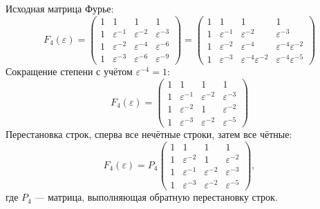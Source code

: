 Исходная матрица Фурье:
\[
    F_4(\varepsilon)
    = \begin{pmatrix}
          1 & 1                & 1                & 1                \\
          1 & \varepsilon^{-1} & \varepsilon^{-2} & \varepsilon^{-3} \\
          1 & \varepsilon^{-2} & \varepsilon^{-4} & \varepsilon^{-6} \\
          1 & \varepsilon^{-3} & \varepsilon^{-6} & \varepsilon^{-9}
    \end{pmatrix}
    = \begin{pmatrix}
          1 & 1                & 1                                 & 1                                 \\
          1 & \varepsilon^{-1} & \varepsilon^{-2}                  & \varepsilon^{-3}                  \\
          1 & \varepsilon^{-2} & \varepsilon^{-4}                  & \varepsilon^{-4} \varepsilon^{-2} \\
          1 & \varepsilon^{-3} & \varepsilon^{-4} \varepsilon^{-2} & \varepsilon^{-4} \varepsilon^{-5}
    \end{pmatrix}
\]
Сокращение степени с учётом $\varepsilon^{-4} = 1$:
\[
    F_4(\varepsilon)
    = \begin{pmatrix}
          1 & 1                & 1                & 1                \\
          1 & \varepsilon^{-1} & \varepsilon^{-2} & \varepsilon^{-3} \\
          1 & \varepsilon^{-2} & 1                & \varepsilon^{-2} \\
          1 & \varepsilon^{-3} & \varepsilon^{-2} & \varepsilon^{-5}
    \end{pmatrix}
\]
Перестановка строк, сперва все нечётные строки, затем все чётные:
\[
    F_4(\varepsilon)
    =
    P_4
    \begin{pmatrix}
        1 & 1                & 1                & 1                \\
        1 & \varepsilon^{-2} & 1                & \varepsilon^{-2} \\
        1 & \varepsilon^{-1} & \varepsilon^{-2} & \varepsilon^{-3} \\
        1 & \varepsilon^{-3} & \varepsilon^{-2} & \varepsilon^{-5}
    \end{pmatrix} ,
\]
где $P_4$ --- матрица, выполняющая обратную перестановку строк.

